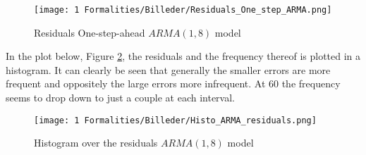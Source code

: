 \begin{figure}[H]
    \centering
    \texttt{[image: 1 Formalities/Billeder/Residuals\_One\_step\_ARMA.png]}
    \caption{Residuals One-step-ahead $ARMA(1,8)$ model}
    \label{fig:Residuals_One_step_ARMA}
\end{figure}
\noindent In the plot below, Figure \ref{fig:Histogram_residuals_ARMA_model}, the residuals and the frequency thereof is plotted in a histogram. It can clearly be seen that generally the smaller errors are more frequent and oppositely the large errors more infrequent. At $60$ the frequency seems to drop down to just a couple at each interval.
\begin{figure}[H]
    \centering
    \texttt{[image: 1 Formalities/Billeder/Histo\_ARMA\_residuals.png]}
    \caption{Histogram over the residuals $ARMA(1,8)$ model}
    \label{fig:Histogram_residuals_ARMA_model}
\end{figure}





